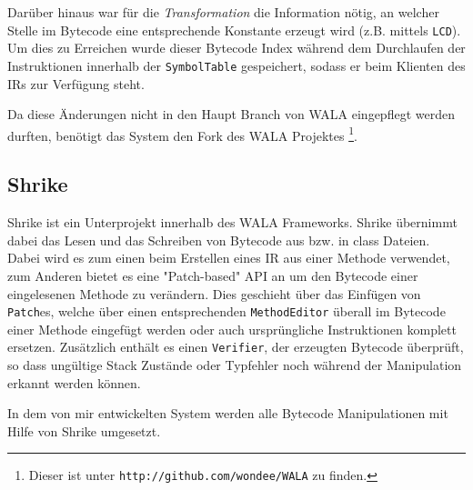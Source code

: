 Darüber hinaus war für die \textit{Transformation} die Information nötig, an welcher Stelle im Bytecode eine
entsprechende Konstante erzeugt wird (z.B. mittels \texttt{LCD}). Um dies zu Erreichen wurde dieser Bytecode 
Index während dem Durchlaufen der Instruktionen innerhalb der \texttt{SymbolTable} gespeichert, sodass er 
beim Klienten des IRs zur Verfügung steht.

Da diese Änderungen nicht in den Haupt Branch von WALA eingepflegt werden durften, benötigt das System den 
Fork des WALA Projektes \footnote{Dieser ist unter \texttt{http://github.com/wondee/WALA} zu finden.}.


\subsection{Shrike}

Shrike ist ein Unterprojekt innerhalb des WALA Frameworks. Shrike übernimmt dabei das Lesen und das 
Schreiben von Bytecode aus bzw. in class Dateien. Dabei wird es zum einen beim Erstellen eines IR aus einer 
Methode verwendet, zum Anderen bietet es eine "Patch-based" API an um den Bytecode einer eingelesenen 
Methode zu verändern. Dies geschieht über das Einfügen von \texttt{Patch}es, welche über einen 
entsprechenden \texttt{MethodEditor} überall im Bytecode einer Methode eingefügt werden oder auch 
ursprüngliche Instruktionen komplett ersetzen. Zusätzlich enthält es einen \texttt{Verifier}, der erzeugten 
Bytecode überprüft, so dass ungültige Stack Zustände oder Typfehler noch während der Manipulation erkannt 
werden können. 

In dem von mir entwickelten System werden alle Bytecode Manipulationen mit Hilfe von Shrike umgesetzt. 

